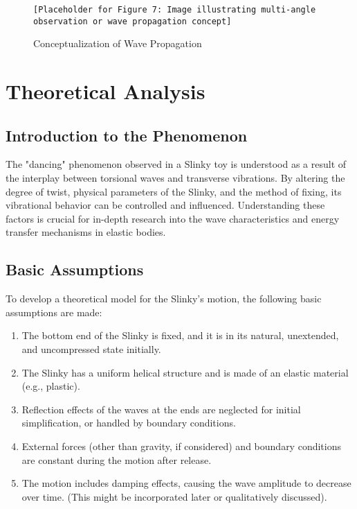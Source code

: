 \documentclass{mcmthesis}  %
\begin{document}
\begin{figure}[h!]
    \centering
    \texttt{[Placeholder for Figure 7: Image illustrating multi-angle observation or wave propagation concept]}
    \caption{Conceptualization of Wave Propagation}
    \label{fig:wave_reflection}
\end{figure}

\section{Theoretical Analysis} %

\subsection{Introduction to the Phenomenon}
The "dancing" phenomenon observed in a Slinky toy is understood as a result of the interplay between torsional waves and transverse vibrations. By altering the degree of twist, physical parameters of the Slinky, and the method of fixing, its vibrational behavior can be controlled and influenced. Understanding these factors is crucial for in-depth research into the wave characteristics and energy transfer mechanisms in elastic bodies.

\subsection{Basic Assumptions}
To develop a theoretical model for the Slinky's motion, the following basic assumptions are made:
\begin{enumerate}
    \item The bottom end of the Slinky is fixed, and it is in its natural, unextended, and uncompressed state initially.
    \item The Slinky has a uniform helical structure and is made of an elastic material (e.g., plastic).
    \item Reflection effects of the waves at the ends are neglected for initial simplification, or handled by boundary conditions.
    \item External forces (other than gravity, if considered) and boundary conditions are constant during the motion after release.
    \item The motion includes damping effects, causing the wave amplitude to decrease over time. (This might be incorporated later or qualitatively discussed).
\end{enumerate}
\end{document}

